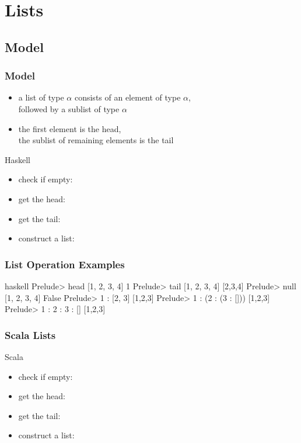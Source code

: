 \documentclass[dvipsnames]{beamer}
\theoremstyle{plain}
\begin{document}
\section{Lists}

\subsection{Model}

\begin{frame}
  \frametitle{Model}

  \begin{itemize}
    \item a list of type \texttt{$\alpha$}
      consists of an element of type \texttt{$\alpha$},\\
      followed by a sublist of type \texttt{$\alpha$}
    \item the first element is the \alert{head},\\
      the sublist of remaining elements is the \alert{tail}
  \end{itemize}

    \pause
    \medskip
    \begin{block}{Haskell}
      \begin{itemize}
        \item check if empty: 
        \item get the head: 
        \item get the tail: 
        \item construct a list: 
      \end{itemize}
    \end{block}
\end{frame}

\begin{frame}[fragile]
  \frametitle{List Operation Examples}

  \begin{example}[Haskell]
    \begin{pygments}{haskell}
Prelude> head [1, 2, 3, 4]
1
Prelude> tail [1, 2, 3, 4]
[2,3,4]
Prelude> null [1, 2, 3, 4]
False
Prelude> 1 : [2, 3]
[1,2,3]
Prelude> 1 : (2 : (3 : []))
[1,2,3]
Prelude> 1 : 2 : 3 : []
[1,2,3]
    \end{pygments}
  \end{example}
\end{frame}

\begin{frame}
  \frametitle{Scala Lists}

  \begin{block}{Scala}
    \begin{itemize}
      \item check if empty: 
      \item get the head: 
      \item get the tail: 
      \item construct a list: 
    \end{itemize}
  \end{block}
\end{frame}
\end{document}
